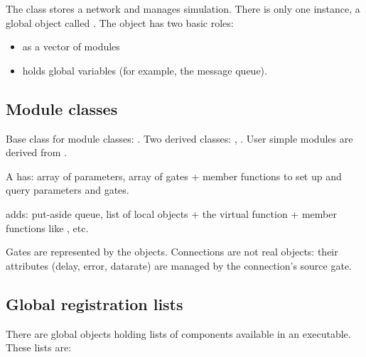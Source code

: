 The  class stores a network and manages simulation. 
There is only one instance, a global object called . 
The object has two basic roles:
\begin{itemize}
  \item{as a vector of modules}
  \item{holds global variables (for example, the message queue).}
\end{itemize}





\subsection{Module classes}

Base class for module classes: . Two derived classes:
, .  User simple
modules are derived from .

A  has: array of parameters, array of gates + member
functions to set up and query parameters and gates.

 adds: put-aside queue, list of local objects + the
virtual function  + member functions like
,  etc.

Gates are represented by the  objects.
Connections are not real objects: their attributes (delay, error,
datarate) are managed by the connection's source gate.





\subsection{Global registration lists}

There are global objects holding lists of components available 
in an {\opp} executable. These lists are:


